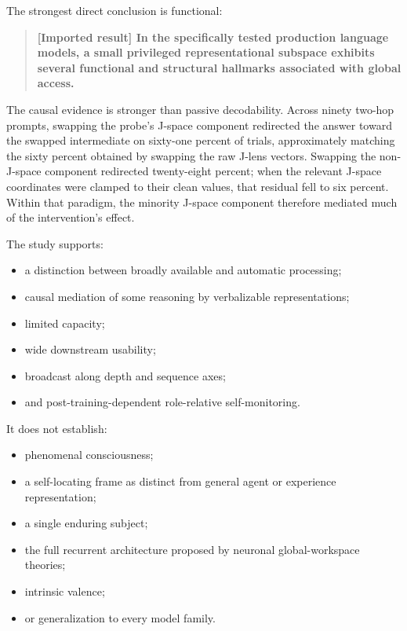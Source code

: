 \documentclass[
  11pt,
]{article}
\providecommand{\tightlist}{%
  \setlength{\itemsep}{0pt}\setlength{\parskip}{0pt}}
\begin{document}
The strongest direct conclusion is functional:

\begin{quote}
\textbf{{[}Imported result{]} In the specifically tested production
language models, a small privileged representational subspace exhibits
several functional and structural hallmarks associated with global
access.}
\end{quote}

The causal evidence is stronger than passive decodability. Across ninety
two-hop prompts, swapping the probe's J-space component redirected the
answer toward the swapped intermediate on sixty-one percent of trials,
approximately matching the sixty percent obtained by swapping the raw
J-lens vectors. Swapping the non-J-space component redirected
twenty-eight percent; when the relevant J-space coordinates were clamped
to their clean values, that residual fell to six percent. Within that
paradigm, the minority J-space component therefore mediated much of the
intervention's effect.

The study supports:

\begin{itemize}
\tightlist
\item
  a distinction between broadly available and automatic processing;
\item
  causal mediation of some reasoning by verbalizable representations;
\item
  limited capacity;
\item
  wide downstream usability;
\item
  broadcast along depth and sequence axes;
\item
  and post-training-dependent role-relative self-monitoring.
\end{itemize}

It does not establish:

\begin{itemize}
\tightlist
\item
  phenomenal consciousness;
\item
  a self-locating frame as distinct from general agent or experience
  representation;
\item
  a single enduring subject;
\item
  the full recurrent architecture proposed by neuronal global-workspace
  theories;
\item
  intrinsic valence;
\item
  or generalization to every model family.
\end{itemize}
\end{document}
